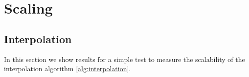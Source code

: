 \section{Scaling} \label{sec:scaling}

\subsection{Interpolation}
In this section we show results for a simple test to measure the scalability of the interpolation algorithm \ref{alg:interpolation}.

\begin{figure}[htbp]
	\begin{center}
		\\

\end{center}
\end{figure}
